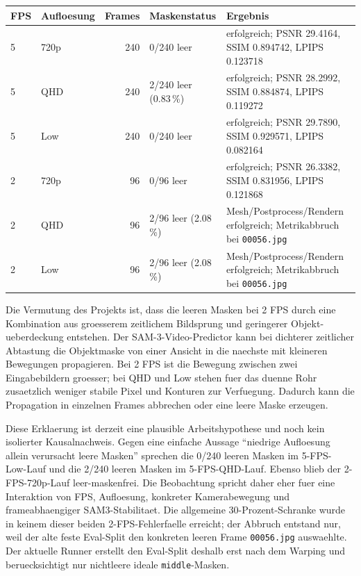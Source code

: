 \documentclass[12pt,a4paper]{article}
\begin{document}
\begin{center}
\small
\begin{tabularx}{\textwidth}{l l r l X}
\textbf{FPS} & \textbf{Aufloesung} & \textbf{Frames} &
\textbf{Maskenstatus} & \textbf{Ergebnis}\\
\hline
5 & 720p & 240 & 0/240 leer & erfolgreich; PSNR 29.4164, SSIM 0.894742, LPIPS 0.123718\\
5 & QHD & 240 & 2/240 leer (0.83\,\%) & erfolgreich; PSNR 28.2992, SSIM 0.884874, LPIPS 0.119272\\
5 & Low & 240 & 0/240 leer & erfolgreich; PSNR 29.7890, SSIM 0.929571, LPIPS 0.082164\\
2 & 720p & 96 & 0/96 leer & erfolgreich; PSNR 26.3382, SSIM 0.831956, LPIPS 0.121868\\
2 & QHD & 96 & 2/96 leer (2.08\,\%) & Mesh/Postprocess/Rendern erfolgreich; Metrikabbruch bei \texttt{00056.jpg}\\
2 & Low & 96 & 2/96 leer (2.08\,\%) & Mesh/Postprocess/Rendern erfolgreich; Metrikabbruch bei \texttt{00056.jpg}\\
\end{tabularx}
\end{center}

Die Vermutung des Projekts ist, dass die leeren Masken bei 2 FPS durch eine
Kombination aus groesserem zeitlichem Bildsprung und geringerer Objekt-
ueberdeckung entstehen. Der SAM-3-Video-Predictor kann bei dichterer zeitlicher
Abtastung die Objektmaske von einer Ansicht in die naechste mit kleineren
Bewegungen propagieren. Bei 2 FPS ist die Bewegung zwischen zwei Eingabebildern
groesser; bei QHD und Low stehen fuer das duenne Rohr zusaetzlich weniger
stabile Pixel und Konturen zur Verfuegung. Dadurch kann die Propagation in
einzelnen Frames abbrechen oder eine leere Maske erzeugen.

Diese Erklaerung ist derzeit eine plausible Arbeitshypothese und noch kein
isolierter Kausalnachweis. Gegen eine einfache Aussage ``niedrige Aufloesung
allein verursacht leere Masken'' sprechen die 0/240 leeren Masken im 5-FPS-
Low-Lauf und die 2/240 leeren Masken im 5-FPS-QHD-Lauf. Ebenso blieb der
2-FPS-720p-Lauf leer-maskenfrei. Die Beobachtung spricht daher eher fuer eine
Interaktion von FPS, Aufloesung, konkreter Kamerabewegung und
frameabhaengiger SAM3-Stabilitaet. Die allgemeine 30-Prozent-Schranke wurde in
keinem dieser beiden 2-FPS-Fehlerfaelle erreicht; der Abbruch entstand nur,
weil der alte feste Eval-Split den konkreten leeren Frame \texttt{00056.jpg}
auswaehlte. Der aktuelle Runner erstellt den Eval-Split deshalb erst nach dem
Warping und beruecksichtigt nur nichtleere ideale \texttt{middle}-Masken.
\end{document}
